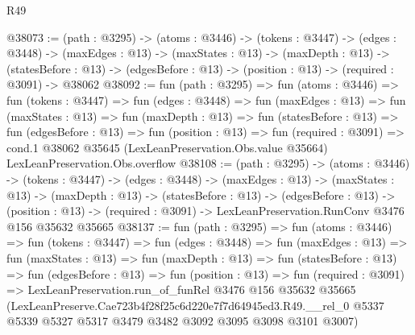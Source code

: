 \begin{lexlean}{R49}
\begin{coremodule}
@38073 := (path : @3295) ->
  (atoms : @3446) ->
  (tokens : @3447) ->
  (edges : @3448) ->
  (maxEdges : @13) ->
  (maxStates : @13) ->
  (maxDepth : @13) ->
  (statesBefore : @13) -> (edgesBefore : @13) -> (position : @13) -> (required : @3091) -> @38062
@38092 := fun (path : @3295) =>
  fun (atoms : @3446) =>
  fun (tokens : @3447) =>
  fun (edges : @3448) =>
  fun (maxEdges : @13) =>
  fun (maxStates : @13) =>
  fun (maxDepth : @13) =>
  fun (statesBefore : @13) =>
  fun (edgesBefore : @13) =>
  fun (position : @13) =>
  fun (required : @3091) =>
  cond.{1} @38062 @35645 (LexLeanPreservation.Obs.value @35664) LexLeanPreservation.Obs.overflow
@38108 := (path : @3295) ->
  (atoms : @3446) ->
  (tokens : @3447) ->
  (edges : @3448) ->
  (maxEdges : @13) ->
  (maxStates : @13) ->
  (maxDepth : @13) ->
  (statesBefore : @13) ->
  (edgesBefore : @13) ->
  (position : @13) -> (required : @3091) -> LexLeanPreservation.RunConv @3476 @156 @35632 @35665
@38137 := fun (path : @3295) =>
  fun (atoms : @3446) =>
  fun (tokens : @3447) =>
  fun (edges : @3448) =>
  fun (maxEdges : @13) =>
  fun (maxStates : @13) =>
  fun (maxDepth : @13) =>
  fun (statesBefore : @13) =>
  fun (edgesBefore : @13) =>
  fun (position : @13) =>
  fun (required : @3091) =>
  LexLeanPreservation.run_of_funRel
    @3476
    @156
    @35632
    @35665
    (LexLeanPreserve.Cae723b4f28f25c6d220e7f7d64945ed3.R49.__rel_0
      @5337
      @5339
      @5327
      @5317
      @3479
      @3482
      @3092
      @3095
      @3098
      @3101
      @3007)
\end{coremodule}
\end{lexlean}
